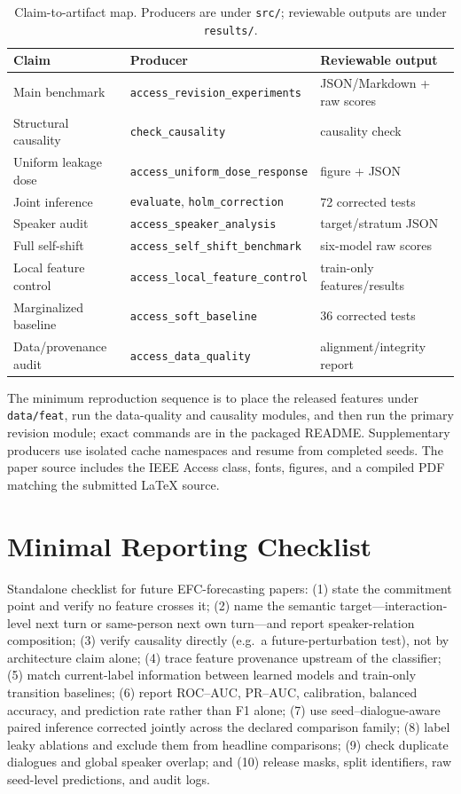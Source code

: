 \documentclass{ieeeaccess}
\begin{document}
\begin{table}[t]
\centering
\scriptsize
\caption{Claim-to-artifact map. Producers are under \texttt{src/}; reviewable outputs are under
\texttt{results/}.}
\label{tab:artifact}
\begin{tabular}{lll}
\toprule
Claim & Producer & Reviewable output \\
\midrule
Main benchmark & \texttt{access\_revision\_experiments} & JSON/Markdown + raw scores \\
Structural causality & \texttt{check\_causality} & causality check \\
Uniform leakage dose & \texttt{access\_uniform\_dose\_response} & figure + JSON \\
Joint inference & \texttt{evaluate}, \texttt{holm\_correction} & 72 corrected tests \\
Speaker audit & \texttt{access\_speaker\_analysis} & target/stratum JSON \\
Full self-shift & \texttt{access\_self\_shift\_benchmark} & six-model raw scores \\
Local feature control & \texttt{access\_local\_feature\_control} & train-only features/results \\
Marginalized baseline & \texttt{access\_soft\_baseline} & 36 corrected tests \\
Data/provenance audit & \texttt{access\_data\_quality} & alignment/integrity report \\
\bottomrule
\end{tabular}
\end{table}

The minimum reproduction sequence is to place the released features under \texttt{data/feat}, run
the data-quality and causality modules, and then run the primary revision module; exact commands
are in the packaged README. Supplementary producers use isolated cache namespaces and resume from
completed seeds. The paper source includes the IEEE Access class, fonts, figures, and a compiled
PDF matching the submitted LaTeX source.

\vspace{-3mm}\section{Minimal Reporting Checklist}

Standalone checklist for future EFC-forecasting papers: (1) state the commitment point and verify
no feature crosses it; (2) name the semantic target---interaction-level next turn or same-person
next own turn---and report speaker-relation composition; (3) verify causality directly (e.g.\ a
future-perturbation test), not by architecture claim alone; (4) trace feature provenance upstream
of the classifier; (5) match current-label information between learned models and train-only
transition baselines; (6) report ROC--AUC, PR--AUC, calibration, balanced accuracy, and prediction
rate rather than F1 alone; (7) use seed--dialogue-aware paired inference corrected jointly across
the declared comparison family; (8) label leaky ablations and exclude them from headline
comparisons; (9) check duplicate dialogues and global speaker overlap; and (10) release masks,
split identifiers, raw seed-level predictions, and audit logs.
\end{document}
